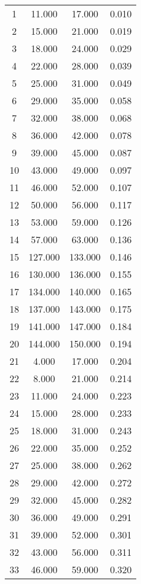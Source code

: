 % 
\begin{tabular}{cccc}
  \hline
  \hline
1 & 11.000 & 17.000 & 0.010 \\ 
  2 & 15.000 & 21.000 & 0.019 \\ 
  3 & 18.000 & 24.000 & 0.029 \\ 
  4 & 22.000 & 28.000 & 0.039 \\ 
  5 & 25.000 & 31.000 & 0.049 \\ 
  6 & 29.000 & 35.000 & 0.058 \\ 
  7 & 32.000 & 38.000 & 0.068 \\ 
  8 & 36.000 & 42.000 & 0.078 \\ 
  9 & 39.000 & 45.000 & 0.087 \\ 
  10 & 43.000 & 49.000 & 0.097 \\ 
  11 & 46.000 & 52.000 & 0.107 \\ 
  12 & 50.000 & 56.000 & 0.117 \\ 
  13 & 53.000 & 59.000 & 0.126 \\ 
  14 & 57.000 & 63.000 & 0.136 \\ 
  15 & 127.000 & 133.000 & 0.146 \\ 
  16 & 130.000 & 136.000 & 0.155 \\ 
  17 & 134.000 & 140.000 & 0.165 \\ 
  18 & 137.000 & 143.000 & 0.175 \\ 
  19 & 141.000 & 147.000 & 0.184 \\ 
  20 & 144.000 & 150.000 & 0.194 \\ 
  21 & 4.000 & 17.000 & 0.204 \\ 
  22 & 8.000 & 21.000 & 0.214 \\ 
  23 & 11.000 & 24.000 & 0.223 \\ 
  24 & 15.000 & 28.000 & 0.233 \\ 
  25 & 18.000 & 31.000 & 0.243 \\ 
  26 & 22.000 & 35.000 & 0.252 \\ 
  27 & 25.000 & 38.000 & 0.262 \\ 
  28 & 29.000 & 42.000 & 0.272 \\ 
  29 & 32.000 & 45.000 & 0.282 \\ 
  30 & 36.000 & 49.000 & 0.291 \\ 
  31 & 39.000 & 52.000 & 0.301 \\ 
  32 & 43.000 & 56.000 & 0.311 \\ 
  33 & 46.000 & 59.000 & 0.320 \\ 

\end{tabular}
